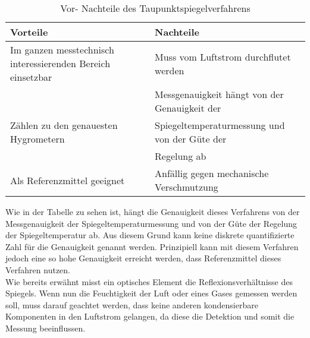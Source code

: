 \renewcommand{\arraystretch}{1.2}
\begin{table}[h]
\centering
\caption{Vor- Nachteile des Taupunktspiegelverfahrens}
\label{vor-nachteile}
\begin{tabular}{l|l}
\textbf{Vorteile} & \textbf{Nachteile} \\ 
\toprule 
Im ganzen messtechnisch interessierenden Bereich einsetzbar & Muss vom Luftstrom durchflutet werden \\ 
\hline 
 & Messgenauigkeit hängt von der Genauigkeit der \\Zählen zu den genauesten Hygrometern &Spiegeltemperaturmessung und von der Güte der \\& Regelung ab  \\ 
\hline 
Als Referenzmittel geeignet & Anfällig gegen mechanische Verschmutzung \\ 
\end{tabular}
\end{table}
\begin{multicols}{3} 
Wie in der Tabelle zu sehen ist, hängt die Genauigkeit dieses Verfahrens von der Messgenauigkeit der Spiegeltemperaturmessung und von der Güte der Regelung der Spiegeltemperatur ab. Aus diesem Grund kann keine diskrete quantifizierte Zahl für die Genauigkeit genannt werden. Prinzipiell kann mit diesem Verfahren jedoch eine so hohe Genauigkeit erreicht werden, dass Referenzmittel dieses Verfahren nutzen.\\
Wie bereits erwähnt misst ein optisches Element die Reflexionsverhältnisse des Spiegels. Wenn nun die Feuchtigkeit der Luft oder eines Gases gemessen werden soll, muss darauf geachtet werden, dass keine anderen kondensierbare Komponenten in den Luftstrom gelangen, da diese die Detektion und somit die Messung beeinflussen. \cite{Hesse2014}\cite{Wikipedia2017}\\
\end{multicols}